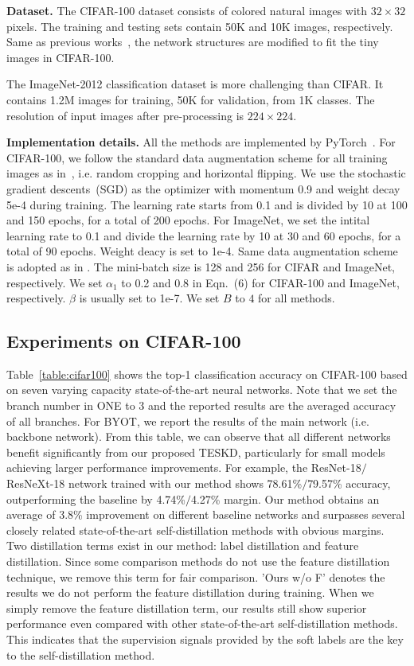 \documentclass[letterpaper]{article} %
\begin{document}
\textbf{Dataset.}
The CIFAR-100 dataset consists of colored natural images with $32\times32$ pixels. The training and testing sets contain 50K and 10K images, respectively. Same as previous works~\cite{zhang2019your,ji2021refine}, the network structures are modified to fit the tiny images in CIFAR-100.

The ImageNet-2012 classification dataset is more challenging than CIFAR. It contains 1.2M images for training, 50K for validation, from 1K classes. The resolution of input images after pre-processing is $224\times224$.

\textbf{Implementation details.}
All the methods are implemented by PyTorch~\cite{paszke2019pytorch}. For CIFAR-100, we follow the standard data augmentation scheme for all training images as in~\cite{zhang2019your,ji2021refine}, i.e. random cropping and horizontal flipping. We use the stochastic gradient descents~(SGD) as the optimizer with momentum 0.9 and weight decay 5e-4 during training. The learning rate starts from 0.1 and is divided by 10 at 100 and 150 epochs, for a total of 200 epochs. For ImageNet, we set the intital learning rate to 0.1 and divide the learning rate by 10 at 30 and 60 epochs, for a total of 90 epochs. Weight deacy is set to 1e-4. Same data augmentation scheme is adopted as in \cite{ji2021refine}. The mini-batch size is 128 and 256 for CIFAR and ImageNet, respectively. We set $\alpha_{1}$ to 0.2 and 0.8 in Eqn.~(6) for CIFAR-100 and ImageNet, respectively. $\beta$ is usually set to 1e-7. We set $B$ to $4$ for all methods.


\subsection{Experiments on CIFAR-100}

Table~\ref{table:cifar100} shows the top-1 classification accuracy on CIFAR-100 based on seven varying capacity state-of-the-art neural networks. Note that we set the branch number in ONE to 3 and the reported results are the averaged accuracy of all branches. For BYOT, we report the results of the main network (i.e. backbone network). From this table, we can observe that all different networks benefit significantly from our proposed TESKD, particularly for small models achieving larger performance improvements. For example, the ResNet-18$/$ResNeXt-18 network trained with our method shows 78.61\%$/$79.57\% accuracy, outperforming the baseline by 4.74\%$/$4.27\% margin. Our method obtains an average of 3.8\% improvement on different baseline networks and surpasses several closely related state-of-the-art self-distillation methods with obvious margins. Two distillation terms exist in our method: label distillation and feature distillation. Since some comparison methods do not use the feature distillation technique, we remove this term for fair comparison. 'Ours w/o F' denotes the results we do not perform the feature distillation during training. When we simply remove the feature distillation term, our results still show superior performance even compared with other state-of-the-art self-distillation methods. This indicates that the supervision signals provided by the soft labels are the key to the self-distillation method.
\end{document}
